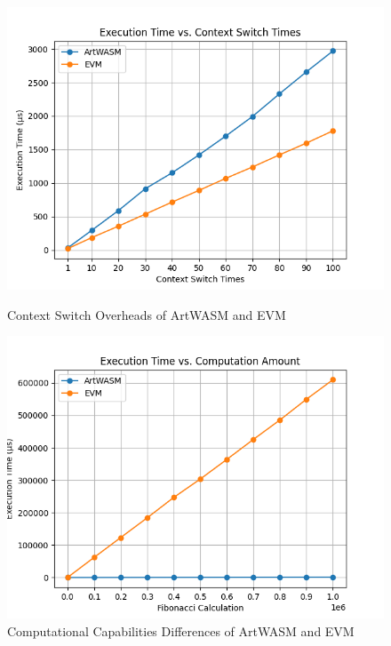 \begin{figure}[htp]
  \centering
  \begin{minipage}{0.3\textwidth}
    \centering
    \includegraphics[width=1\linewidth]{sections/et-vs-cst.png}
    \caption{Context Switch Overheads of ArtWASM and EVM}
    \label{fig:image1}
  \end{minipage}\hfill
  \begin{minipage}{0.3\textwidth}
    \centering
    \includegraphics[width=1\linewidth]{sections/et-vs-ca.png}
    \caption{Computational Capabilities Differences of ArtWASM and EVM}
    \label{fig:image2}
  \end{minipage}\hfill
  \begin{minipage}{0.3\textwidth}

\end{minipage}
\end{figure}

